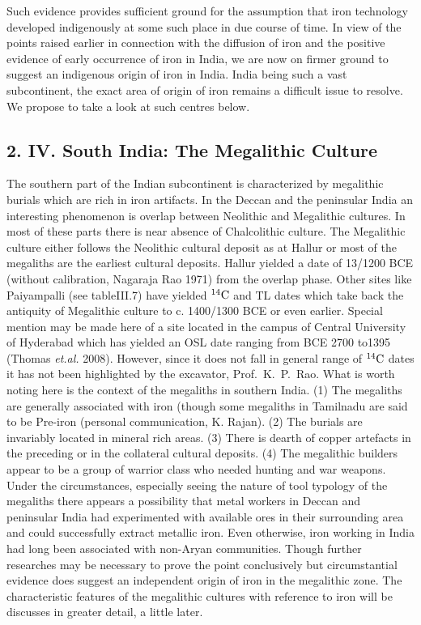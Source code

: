 Such evidence provides sufficient ground for the assumption that iron technology developed indigenously at some such place in due course of time. In view of the points raised earlier in connection with the diffusion of iron and the positive evidence of early occurrence of iron in India, we are now on firmer ground to suggest an indigenous origin of iron in India. India being such a vast subcontinent, the exact area of origin of iron remains a difficult issue to resolve. We propose to take a look at such centres below.

\vspace{-.3cm}

\subsection*{2. IV. South India: The Megalithic Culture}\label{subsection-7}

\vspace{-.2cm}

The southern part of the Indian subcontinent is characterized by megalithic burials which are rich in iron artifacts. In the Deccan and the peninsular India an interesting phenomenon is overlap between Neolithic and Megalithic cultures. In most of these parts there is near absence of Chalcolithic culture. The Megalithic culture either follows the Neolithic cultural deposit as at Hallur or most of the megaliths are the earliest cultural deposits. Hallur yielded a date of 13/1200 BCE (without calibration, Nagaraja Rao 1971) from the overlap phase. Other sites like Paiyampalli (see tableIII.7) have yielded $^{14}{\rm C}$ and TL dates which take back the antiquity of Megalithic culture to c. 1400/1300 BCE or even earlier. Special mention may be made here of a site located in the campus of Central University of Hyderabad which has yielded an OSL date ranging from BCE 2700 to1395 (Thomas \textit{et.al.} 2008). However, since it does not fall in general range of $^{14}{\rm C}$ dates it has not been highlighted by the excavator, Prof.~K.~P.~Rao. What is worth noting here is the context of the megaliths in southern India. (1) The megaliths are generally associated with iron (though some megaliths in Tamilnadu are said to be Pre-iron (personal communication, K. Rajan).  (2) The burials are invariably located in mineral rich areas. (3) There is dearth of copper artefacts in the preceding or in the collateral cultural deposits. (4) The megalithic builders appear to be a group of warrior class who needed hunting and war weapons. Under the circumstances, especially seeing the nature of tool typology of the megaliths there appears a possibility that metal workers in Deccan and peninsular India had experimented with available ores in their surrounding area and could successfully extract metallic iron. Even otherwise, iron working in India had long been associated with non-Aryan communities. Though further researches may be necessary to prove the point conclusively but circumstantial evidence does suggest an independent origin of iron in the megalithic zone. The characteristic features of the megalithic cultures with reference to iron will be discusses in greater detail, a little later.

